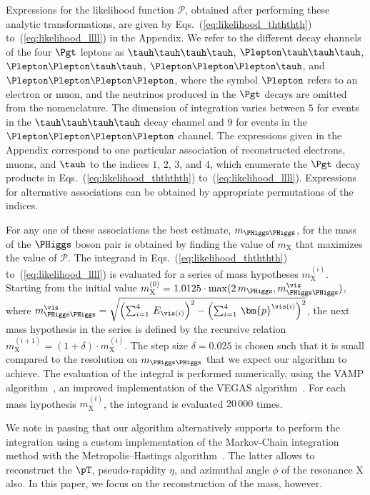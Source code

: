 Expressions for the likelihood function $\mathcal{P}$, obtained after performing these analytic transformations, 
are given by Eqs.~(\ref{eq:likelihood_thththth}) to~(\ref{eq:likelihood_llll}) in the Appendix.
We refer to the different decay channels of the four $\Pgt$ leptons as 
$\tauh\tauh\tauh\tauh$, $\Plepton\tauh\tauh\tauh$, $\Plepton\Plepton\tauh\tauh$, $\Plepton\Plepton\Plepton\tauh$, and $\Plepton\Plepton\Plepton\Plepton$, 
where the symbol $\Plepton$ refers to an electron or muon,
and the neutrinos produced in the $\Pgt$ decays are omitted from the nomenclature.
The dimension of integration varies between $5$ for events in the $\tauh\tauh\tauh\tauh$ decay channel and $9$ for events in the $\Plepton\Plepton\Plepton\Plepton$ channel.
The expressions given in the Appendix correspond to one particular association of reconstructed electrons, muons, and $\tauh$ 
to the indices $1$, $2$, $3$, and $4$, which enumerate the $\Pgt$ decay products in Eqs.~(\ref{eq:likelihood_thththth}) to~(\ref{eq:likelihood_llll}).
Expressions for alternative associations can be obtained by appropriate permutations of the indices.

For any one of these associations
the best estimate, $m_{\PHiggs\PHiggs}$, for the mass of the $\PHiggs$ boson pair is obtained 
by finding the value of $m_{\textrm{X}}$ that maximizes the value of $\mathcal{P}$.
The integrand in Eqs.~(\ref{eq:likelihood_thththth}) to~(\ref{eq:likelihood_llll})
is evaluated for a series of mass hypotheses $m_{\textrm{X}}^{(i)}$.
Starting from the initial value $m_{\textrm{X}}^{(0)} = 1.0125 \cdot \max (2 \, m_{\PHiggs}, m_{\PHiggs\PHiggs}^{\vis})$,
where
$m_{\PHiggs\PHiggs}^{\vis} = \sqrt{\left(\sum_{i=1}^{4} \, E_{\vis(i)}\right)^{2} - \left(\sum_{i=1}^{4} \, \bm{p}^{\vis(i)}\right)^{2}}$,
the next mass hypothesis in the series is defined by the recursive relation $m_{\textrm{X}}^{(i+1)} = (1 + \delta) \cdot m_{\textrm{X}}^{(i)}$.
The step size $\delta = 0.025$ is chosen such that it is small compared to the resolution on $m_{\PHiggs\PHiggs}$
that we expect our algorithm to achieve.
The evaluation of the integral is performed numerically, using the VAMP algorithm~\cite{VAMP},
an improved implementation of the VEGAS algorithm~\cite{VEGAS}.
For each mass hypothesis $m_{\textrm{X}}^{(i)}$, the integrand is evaluated $20\,000$ times.

We note in passing that our algorithm alternatively supports to perform the integration using a custom implementation
of the Markov-Chain integration method with the Metropolis--Hastings algorithm~\cite{Metropolis_Hastings}.
The latter allows to reconstruct the $\pT$, pseudo-rapidity $\eta$, and azimuthal angle $\phi$ of the resonance $\textrm{X}$ also.
In this paper, we focus on the reconstruction of the mass, however.

